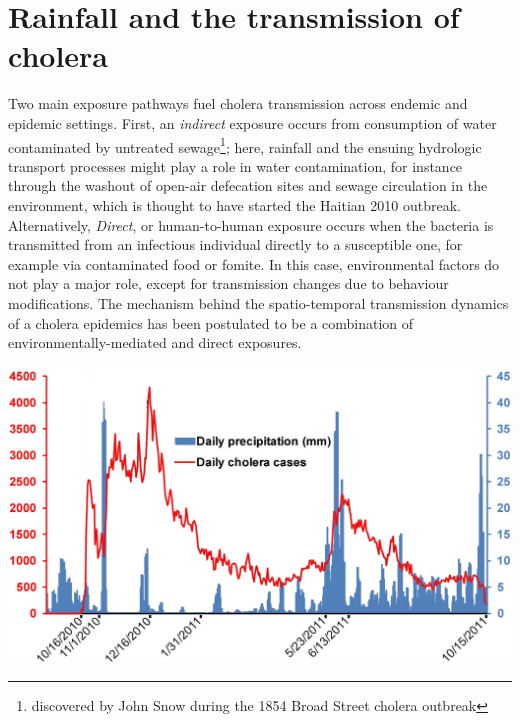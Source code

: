 \section{Rainfall and the transmission of cholera}\label{sec:rainfall-cholera-transmission}
Two main exposure pathways fuel cholera transmission across endemic and epidemic settings.
First, an \textit{indirect} exposure occurs from consumption of water contaminated by untreated sewage\footnote{discovered by John Snow during the 1854 Broad Street cholera outbreak}; here, rainfall and the ensuing hydrologic transport processes might play a role in water contamination, for instance through the washout of open-air defecation sites and sewage circulation in the environment, which is thought to have started the Haitian 2010 outbreak\cite{Piarroux:UnderstandingCholeraEpidemic:2011}.
Alternatively, \textit{Direct}, or human-to-human exposure occurs when the bacteria is transmitted from an infectious individual directly to a susceptible one, for example via contaminated food or fomite. In this case, environmental factors do not play a major role, except for transmission changes due to behaviour modifications.
The mechanism behind the spatio-temporal transmission dynamics of a cholera epidemics has been postulated to be a combination of environmentally-mediated and direct exposures.
 \begin{marginfigure}[-2\baselineskip]
\centering
\includegraphics{fig/cholera-rainfall.png}
\label{fig:rain}
\end{marginfigure}
